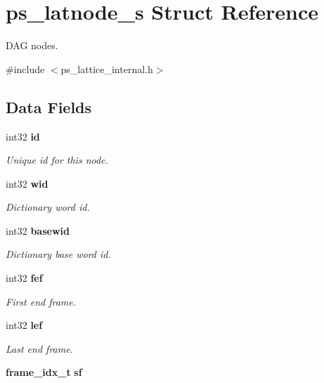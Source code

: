 \section{ps\-\_\-latnode\-\_\-s Struct Reference}
\label{structps__latnode__s}


D\-A\-G nodes.  




{\ttfamily \#include $<$ps\-\_\-lattice\-\_\-internal.\-h$>$}

\subsection*{Data Fields}
\begin{DoxyCompactItemize}
\item 
int32 {\bf id}\label{structps__latnode__s_a78243b37753f7a209c15d6adf98ee3f7}

\begin{DoxyCompactList}\small\item\em Unique id for this node. \end{DoxyCompactList}\item 
int32 {\bf wid}\label{structps__latnode__s_afd85dbd410d6e6d970c73088bc6fb97e}

\begin{DoxyCompactList}\small\item\em Dictionary word id. \end{DoxyCompactList}\item 
int32 {\bf basewid}\label{structps__latnode__s_ae3b3dc7d14347e6380859c74b9a02589}

\begin{DoxyCompactList}\small\item\em Dictionary base word id. \end{DoxyCompactList}\item 
int32 {\bf fef}\label{structps__latnode__s_a584ee5a303355d851ac903718998df14}

\begin{DoxyCompactList}\small\item\em First end frame. \end{DoxyCompactList}\item 
int32 {\bf lef}\label{structps__latnode__s_a5c7b9114d131151d6ce85228ea9f829d}

\begin{DoxyCompactList}\small\item\em Last end frame. \end{DoxyCompactList}\item 
{\bf frame\-\_\-idx\-\_\-t} {\bf sf}\label{structps__latnode__s_a4171e956043e7856c04d84498f16cf29}


\end{DoxyCompactItemize}
